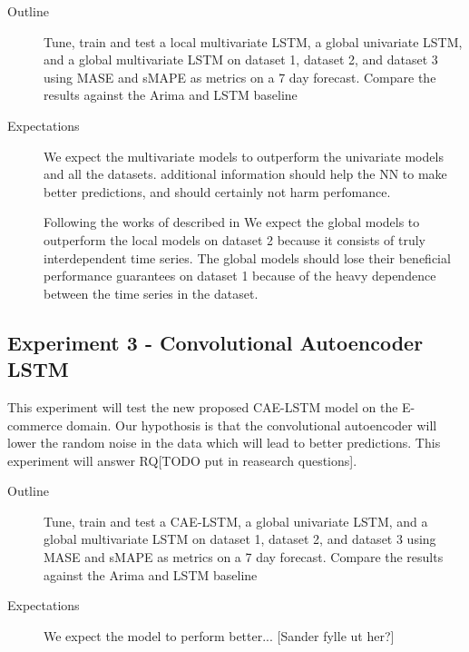 \begin{description}
  \item[Outline]{Tune, train and test a local multivariate LSTM, a global univariate LSTM,
              and a global multivariate LSTM on dataset 1,
              dataset 2, and dataset 3 using MASE and sMAPE as metrics on a 7 day forecast. Compare the results against the Arima and LSTM baseline}
\end{description}

\begin{description}
  \item[Expectations]{

              We expect the multivariate models to outperform the univariate models and all the datasets.
              additional information should help the NN to make better predictions, and should certainly not harm perfomance.

              Following the works of \cite{Rabanser2020} described in 
              We expect the global models to outperform the local models on dataset 2 because it consists
              of truly interdependent time series. The global models should lose their beneficial performance guarantees
              on dataset 1 because of the heavy dependence between the time series in the dataset.

        }
\end{description}





\subsection{Experiment 3 - Convolutional Autoencoder LSTM}
This experiment will test the new proposed CAE-LSTM model on
the E-commerce domain. Our hypothosis is that the convolutional autoencoder
will lower the random noise in the data which will lead to better predictions.
This experiment will answer RQ[TODO put in reasearch questions].

\begin{description}
  \item[Outline]{Tune, train and test a CAE-LSTM, a global univariate LSTM,
              and a global multivariate LSTM on dataset 1,
              dataset 2, and dataset 3 using MASE and sMAPE as metrics on a 7 day forecast. Compare the results against the Arima and LSTM baseline}
\end{description}

\begin{description}
  \item[Expectations]{
              We expect the model to perform better... [Sander fylle ut her?]
        }
\end{description}